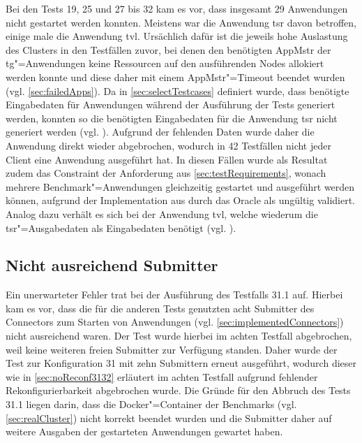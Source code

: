 Bei den Tests 19, 25 und 27 bis 32 kam es vor, dass insgesamt 29 Anwendungen nicht gestartet werden konnten.
Meistens war die Anwendung \acl{tsr} davon betroffen, einige male die Anwendung \acl{tvl}.
Ursächlich dafür ist die jeweils hohe Auslastung des Clusters in den Testfällen zuvor, bei denen den benötigten \ac{AppMstr} der \acl{tg}"=Anwendungen keine Ressourcen auf den ausführenden Nodes allokiert werden konnte und diese daher mit einem \ac{AppMstr}"=Timeout beendet wurden (vgl. \autoref{sec:failedApps}).
Da in \autoref{sec:selectTestcases} definiert wurde, dass benötigte Eingabedaten für Anwendungen während der Ausführung der Tests generiert werden, konnten so die benötigten Eingabedaten für die Anwendung \acl{tsr} nicht generiert werden (vgl. ).
Aufgrund der fehlenden Daten wurde daher die Anwendung direkt wieder abgebrochen, wodurch in 42 Testfällen nicht jeder Client eine Anwendung ausgeführt hat.
In diesen Fällen wurde als Resultat zudem das Constraint der Anforderung aus \autoref{sec:testRequirements}, wonach mehrere Benchmark"=Anwendungen gleichzeitig gestartet und ausgeführt werden können, aufgrund der Implementation aus  durch das Oracle als ungültig validiert.
Analog dazu verhält es sich bei der Anwendung \acl{tvl}, welche wiederum die \acl{tsr}"=Ausgabedaten als Eingabedaten benötigt (vgl. ).

\subsection{Nicht ausreichend Submitter}
\label{sec:notEnoughSubmitter}

Ein unerwarteter Fehler trat bei der Ausführung des Testfalls 31.1 auf.
Hierbei kam es vor, dass die für die anderen Tests genutzten acht Submitter des Connectors zum Starten von Anwendungen (vgl. \autoref{sec:implementedConnectors}) nicht ausreichend waren.
Der Test wurde hierbei im achten Testfall abgebrochen, weil keine weiteren freien Submitter zur Verfügung standen.
Daher wurde der Test zur Konfiguration 31 mit zehn Submittern erneut ausgeführt, wodurch dieser wie in \autoref{sec:noReconf3132} erläutert im achten Testfall aufgrund fehlender Rekonfigurierbarkeit abgebrochen wurde.
Die Gründe für den Abbruch des Tests 31.1 liegen darin, dass die Docker"=Container der Benchmarks (vgl. \autoref{sec:realCluster}) nicht korrekt beendet wurden und die Submitter daher auf weitere Ausgaben der gestarteten Anwendungen gewartet haben.
